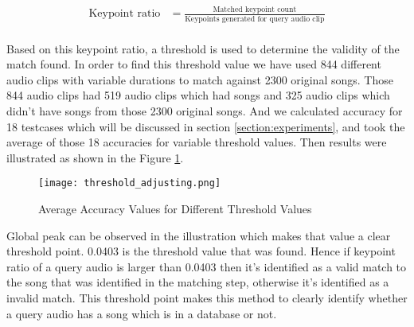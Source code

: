 \begin{align*}
\text{Keypoint ratio} &= \frac{\text{Matched keypoint count}}{\text{Keypoints generated for query audio clip}}\\
\end{align*}

Based on this keypoint ratio, a threshold is used to determine the validity of the match found. In order to find this
threshold value we have used 844 different audio clips with variable durations to match against 2300 original songs.
Those 844 audio clips had 519 audio clips which had songs and 325 audio clips which didn't have songs from those 
2300 original songs. And we calculated accuracy for 18 testcases which will be discussed in section 
\ref{section:experiments}, and took the average of those 18 accuracies for variable threshold values. Then results were
illustrated as shown in the Figure \ref{fig:threshold}. 

\begin{figure}[H]
  \centering
  \texttt{[image: threshold\_adjusting.png]}
  \caption{Average Accuracy Values for Different Threshold Values}
  \label{fig:threshold}
\end{figure}

Global peak can be observed in the illustration which makes that value a clear threshold point. 0.0403 is the threshold
value that was found. Hence if keypoint ratio of a query audio is larger than 0.0403 then it's identified as a valid match
to the song that was identified in the matching step, otherwise it's identified as a invalid match. This threshold point
makes this method to clearly identify whether a query audio has a song which is in a database or not.